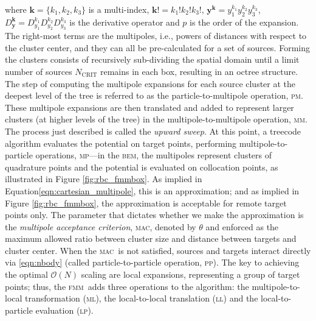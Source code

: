 \documentclass[final,3p,times]{elsarticle}
\newcommand{\bem}{\textsc{bem}\xspace}
\newcommand{\fmm}{\textsc{fmm}\xspace}
\newcommand{\bigO}{\mathcal{O}}
\newcommand{\ptom}{\textsc{p}\texttwooldstyle\textsc{m}\xspace} %
\newcommand{\ltop}{\textsc{l}\texttwooldstyle\textsc{p}\xspace} %
\newcommand{\mtop}{\textsc{m}\texttwooldstyle\textsc{p}\xspace} %
\newcommand{\mtom}{\textsc{m}\texttwooldstyle\textsc{m}\xspace} %
\newcommand{\mtol}{\textsc{m}\texttwooldstyle\textsc{l}\xspace} %
\newcommand{\ltol}{\textsc{l}\texttwooldstyle\textsc{l}\xspace}  %
\newcommand{\ptop}{\textsc{p}\texttwooldstyle\textsc{p}\xspace} %
\newcommand{\ncrit}{N_{\text{CRIT}}}
\newcommand{\mac}{\textsc{mac}}
\newcommand{\vect}[1]{\mathbf{#1}}
\begin{document}
\noindent where $\vect{k}=\{k_1, k_2, k_3\}$ is a multi-index, $\vect{k}! = k_1!k_2!k_3!$, $\vect{y}^{\vect{k}} = y_1^{k_1}y_2^{k_2}y_3^{k_3}$, $D_{\vect{y}}^{\vect{k}} = D^{k_1}_{y_1}D^{k_2}_{y_2}D^{k_3}_{y_3}$ is the derivative operator and $p$ is the order of the expansion. The right-most terms are the multipoles, i.e., powers of distances with respect to the cluster center, and they can all be pre-calculated for a set of sources. Forming the clusters consists of recursively sub-dividing the spatial domain until a limit number of sources $\ncrit$ remains in each box, resulting in an octree structure. 
The step of computing the multipole expansions for each source cluster at the deepest level of the tree is referred to as the particle-to-multipole operation, {\ptom}. These multipole expansions are then translated and added to represent larger clusters (at higher levels of the tree) in the multipole-to-multipole operation, {\mtom}. The process just described is called the \emph{upward sweep}.
At this point, a treecode algorithm evaluates the potential on target points, performing  multipole-to-particle operations, {\mtop}---in the \bem, the multipoles represent clusters of quadrature points and the potential is evaluated on collocation points, as illustrated in Figure \ref{fig:rbc_fmmbox}. As implied in Equation\eqref{eqn:cartesian_multipole}, this is an approximation; and as implied in Figure \ref{fig:rbc_fmmbox}, the approximation is acceptable for remote target points only. The parameter that dictates whether we make the approximation is the \emph{multipole acceptance criterion}, \mac, denoted by $\theta$ and enforced as the maximum allowed ratio between cluster size and distance between targets and cluster center. When the \mac\ is not satisfied, sources and targets interact directly via \eqref{eqn:nbody} (called particle-to-particle operation, \ptop). The key to achieving the optimal $\bigO(N)$ scaling are local expansions, representing a group of target points; thus, the \fmm\ adds three operations to the algorithm: the multipole-to-local transformation (\mtol), the local-to-local translation (\ltol) and the local-to-particle evaluation (\ltop).
\end{document}
